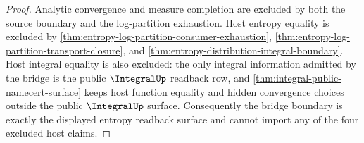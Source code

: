 \begin{proof}
Analytic convergence and measure completion are excluded by both the source boundary and the log-partition exhaustion. Host entropy equality is excluded by \autoref{thm:entropy-log-partition-consumer-exhaustion}, \autoref{thm:entropy-log-partition-transport-closure}, and \autoref{thm:entropy-distribution-integral-boundary}. Host integral equality is also excluded: the only integral information admitted by the bridge is the public $\IntegralUp$ readback row, and \autoref{thm:integral-public-namecert-surface} keeps host function equality and hidden convergence choices outside the public $\IntegralUp$ surface. Consequently the bridge boundary is exactly the displayed entropy readback surface and cannot import any of the four excluded host claims.
\end{proof}
